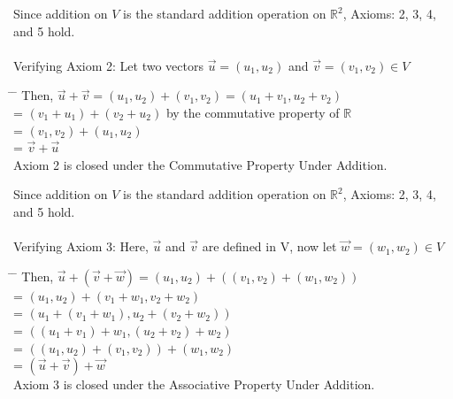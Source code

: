 \documentclass[addpoints]{exam}
\begin{document}
\begin{tcolorbox}[colback=cyan!5!white,colframe=cyan!75!black,title=1. c) Solution]
Since addition on $V$ is the standard addition operation on $\mathbb{R}^2$, Axioms: 2, 3, 4, and 5 hold.\\ \\
Verifying Axiom 2: \space \space \space Let two vectors $\vec{u} = (u_1,u_2)$ and $\vec{v}=(v_1,v_2) \in V$      
\begin{tabbing}
\hspace*{10em}\= \hspace*{2em} \= \kill %
    \>   Then, $\vec{u}+\vec{v} = (u_1, u_2) +(v_1,v_2) = (u_1+v_1, u_2+v_2)$ \\
    \> \hspace{5.4em} =  $(v_1+u_1) + (v_2+u_2)$ by the commutative property of $\mathbb{R}$\\
    \> \hspace{5.4em} = $(v_1,v_2)+(u_1,u_2)$\\
    \> \hspace{5.4em} = $\vec{v}+\vec{u}$\\
    Axiom 2 is closed under the Commutative Property Under Addition.
\end{tabbing}
\end{tcolorbox}

\begin{tcolorbox}[colback=cyan!5!white,colframe=cyan!75!black,title=1. c) Solution Continued]
Since addition on $V$ is the standard addition operation on $\mathbb{R}^2$, Axioms: 2, 3, 4, and 5 hold.\\ \\
Verifying Axiom 3: \space \space \space Here, $\vec{u}$ and $\vec{v}$ are defined in V, now let $\vec{w}=(w_1,w_2) \in V$      
\begin{tabbing}
\hspace*{10em}\= \hspace*{2em} \= \kill %
    \>   Then, $\vec{u}+(\vec{v}+\vec{w}) = (u_1, u_2) +((v_1,v_2)+(w_1,w_2))$\\
    \> \hspace{7.9em} =  $(u_1, u_2) +(v_1+w_1,v_2+w_2)$  \\
    \> \hspace{7.9em} =  $(u_1+(v_1+w_1),u_2 +(v_2+w_2))$ \\
    \> \hspace{7.9em} =  $((u_1+v_1)+w_1,(u_2+v_2)+w_2)$ \\
    \> \hspace{7.9em} =  $((u_1,u_2)+(v_1,v_2))+(w_1,w_2)$ \\
    \> \hspace{7.9em} =  $(\vec{u}+\vec{v})+\vec{w}$ \\
    Axiom 3 is closed under the Associative Property Under Addition.
\end{tabbing}
\end{tcolorbox}
\end{document}
